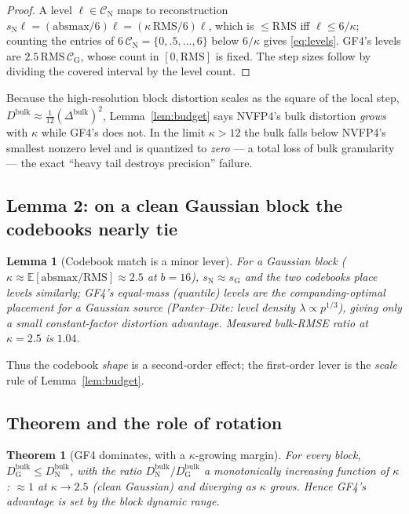 \documentclass[11pt]{article}
\newtheorem{lemma}{Lemma}
\newtheorem{theorem}{Theorem}
\theoremstyle{remark}
\newcommand{\E}{\mathbb{E}}
\newcommand{\rms}{\mathrm{RMS}}
\newcommand{\absmax}{\mathrm{absmax}}
\begin{document}
\begin{proof}
A level $\ell\in\mathcal C_{\mathrm N}$ maps to reconstruction
$s_{\mathrm N}\ell=(\absmax/6)\ell=(\kappa\,\rms/6)\ell$, which is $\le\rms$ iff
$\ell\le 6/\kappa$; counting the entries of $6\,\mathcal C_{\mathrm N}=\{0,.5,\dots,6\}$
below $6/\kappa$ gives \eqref{eq:levels}. GF4's levels are
$2.5\,\rms\,\mathcal C_{\mathrm G}$, whose count in $[0,\rms]$ is fixed. The step
sizes follow by dividing the covered interval by the level count.
\end{proof}

Because the high-resolution block distortion scales as the square of the local
step, $D^{\mathrm{bulk}}\approx\tfrac{1}{12}(\Delta^{\mathrm{bulk}})^2$,
Lemma~\ref{lem:budget} says NVFP4's bulk distortion \emph{grows} with $\kappa$
while GF4's does not. In the limit $\kappa>12$ the bulk falls below NVFP4's
smallest nonzero level and is quantized to \emph{zero} --- a total loss of bulk
granularity --- the exact ``heavy tail destroys precision'' failure.

\subsection{Lemma 2: on a clean Gaussian block the codebooks nearly tie}

\begin{lemma}[Codebook match is a minor lever]
\label{lem:codebook}
For a Gaussian block ($\kappa\!\approx\!\E[\absmax/\rms]\!\approx\!2.5$ at
$b{=}16$), $s_{\mathrm N}\approx s_{\mathrm G}$ and the two codebooks place levels
similarly; GF4's equal-mass (quantile) levels are the companding-optimal
placement for a Gaussian source (Panter--Dite: level density
$\lambda\propto p^{1/3}$), giving only a small constant-factor distortion
advantage. Measured bulk-RMSE ratio at $\kappa{=}2.5$ is $1.04$.
\end{lemma}

Thus the codebook \emph{shape} is a second-order effect; the first-order lever is
the \emph{scale} rule of Lemma~\ref{lem:budget}.

\subsection{Theorem and the role of rotation}

\begin{theorem}[GF4 dominates, with a $\kappa$-growing margin]
\label{thm:gf4}
For every block, $D^{\mathrm{bulk}}_{\mathrm G}\le D^{\mathrm{bulk}}_{\mathrm N}$,
with the ratio $D^{\mathrm{bulk}}_{\mathrm N}/D^{\mathrm{bulk}}_{\mathrm G}$ a
monotonically increasing function of $\kappa$: $\approx 1$ at $\kappa\!\to\!2.5$
(clean Gaussian) and diverging as $\kappa$ grows. Hence GF4's advantage is set by
the block dynamic range.
\end{theorem}
\end{document}
